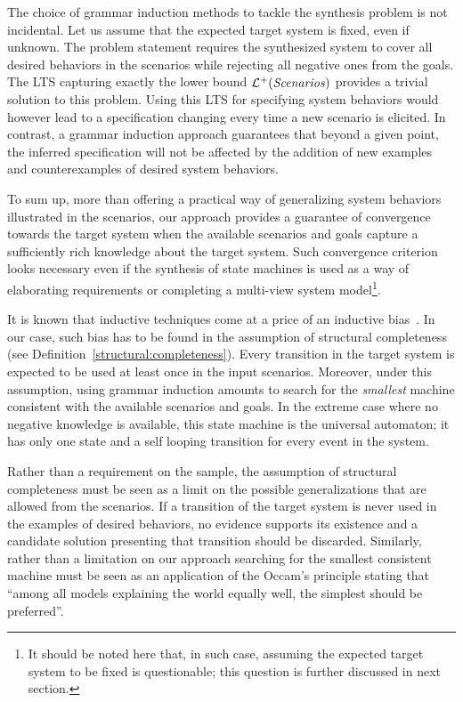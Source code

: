 The choice of grammar induction methods to tackle the synthesis problem is not incidental. Let us assume that the expected target system is fixed, even if unknown. The problem statement requires the synthesized system to cover all desired behaviors in the scenarios while rejecting all negative ones from the goals. The LTS capturing exactly the lower bound $\mathcal{L}^+(\mbox{\emph{Scenarios}})$ provides a trivial solution to this problem. Using this LTS for specifying system behaviors would however lead to a specification changing every time a new scenario is elicited. In contrast, a grammar induction approach guarantees that beyond a given point, the inferred specification will not be affected by the addition of new examples and counterexamples of desired system behaviors. 

To sum up, more than offering a practical way of generalizing system behaviors illustrated in the scenarios, our approach provides a guarantee of convergence towards the target system when the available scenarios and goals capture a sufficiently rich knowledge about the target system. Such convergence criterion looks necessary even if the synthesis of state machines is used as a way of elaborating requirements or completing a multi-view system model\footnote{It should be noted here that, in such case, assuming the expected target system to be fixed is questionable; this question is further discussed in next section.}.

It is known that inductive techniques come at a price of an inductive bias~\cite{Mitchell:1980}. In our case, such bias has to be found in the assumption of structural completeness (see Definition~\ref{structural:completeness}). Every transition in the target system is expected to be used at least once in the input scenarios. Moreover, under this assumption, using grammar induction amounts to search for the \emph{smallest} machine consistent with the available scenarios and goals. In the extreme case where no negative knowledge is available, this state machine is the universal automaton; it has only one state and a self looping transition for every event in the system.

Rather than a requirement on the sample, the assumption of structural completeness must be seen as a limit on the possible generalizations that are allowed from the scenarios. If a transition of the target system is never used in the examples of desired behaviors, no evidence supports its existence and a candidate solution presenting that transition should be discarded. Similarly, rather than a limitation on our approach searching for the smallest consistent machine must be seen as an application of the Occam's principle stating that ``among all models explaining the world equally well, the simplest should be preferred''.

